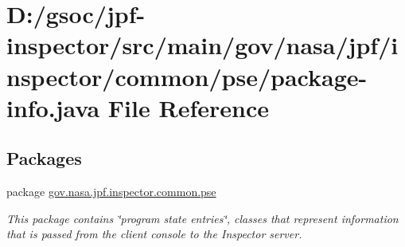 \hypertarget{common_2pse_2package-info_8java}{}\section{D\+:/gsoc/jpf-\/inspector/src/main/gov/nasa/jpf/inspector/common/pse/package-\/info.java File Reference}
\label{common_2pse_2package-info_8java}
\subsection*{Packages}
\begin{DoxyCompactItemize}
\item 
package \hyperlink{namespacegov_1_1nasa_1_1jpf_1_1inspector_1_1common_1_1pse}{gov.\+nasa.\+jpf.\+inspector.\+common.\+pse}
\begin{DoxyCompactList}\small\item\em This package contains \char`\"{}program state entries\char`\"{}, classes that represent information that is passed from the client console to the Inspector server. \end{DoxyCompactList}\end{DoxyCompactItemize}
